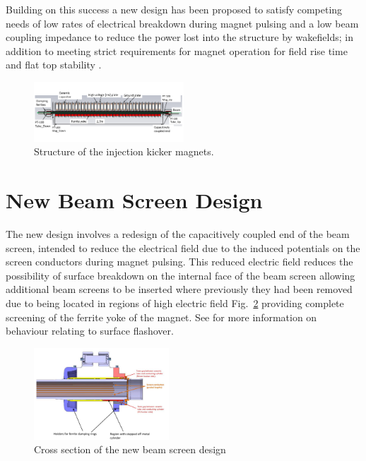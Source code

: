 \documentclass[a4paper,
              ]{jacow}
\begin{document}
Building on this success a new design has been proposed to satisfy competing needs of low rates of electrical breakdown during magnet pulsing and a low beam coupling impedance to reduce the power lost into the structure by wakefields; in addition to meeting strict requirements for magnet operation for field rise time and flat top stability \cite{mkiUpgrade}. 

\begin{figure}
\includegraphics[width=0.5\textwidth]{MKICrossSectionYZ.pdf}
\caption{Structure of the injection kicker magnets.}
\label{fig:mkiStruct}
\end{figure}

\section{New Beam Screen Design}

The new design involves a redesign of the capacitively coupled end of the beam screen, intended to reduce the electrical field due to the induced potentials on the screen conductors during magnet pulsing. This reduced electric field reduces the possibility of surface breakdown on the internal face of the beam screen allowing additional beam screens to be inserted where previously they had been removed due to being located in regions of high electric field Fig.~\ref{fig:beamScreenCross} providing complete screening of the ferrite yoke of the magnet. See \cite{mki-ElecBreakdown} for more information on behaviour relating to surface flashover. 

\begin{figure}
\begin{center}
\includegraphics[width=0.45\textwidth]{beamScreenCrossSectionLabelled.pdf}
\caption{Cross section of the new beam screen design}
\label{fig:beamScreenCross}
\end{center}
\end{figure}
\end{document}
